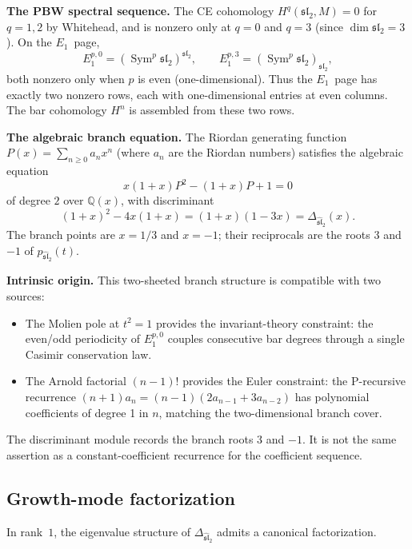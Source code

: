 \medskip\noindent
\textbf{The PBW spectral sequence.}
The CE cohomology \(H^q(\mathfrak{sl}_2,M)=0\) for
\(q=1,2\) by Whitehead, and is nonzero only at \(q=0\) and
\(q=3\) (since \(\dim\mathfrak{sl}_2=3\)).
On the \(E_1\)~page,
\[
E_1^{p,0}=(\operatorname{Sym}^p\mathfrak{sl}_2)^{\mathfrak{sl}_2},
\qquad
E_1^{p,3}=(\operatorname{Sym}^p\mathfrak{sl}_2)_{\mathfrak{sl}_2},
\]
both nonzero only when \(p\) is even (one-dimensional).
Thus the \(E_1\)~page has exactly two nonzero rows,
each with one-dimensional entries at even columns.
The bar cohomology \(H^n\) is assembled from these two rows.

\medskip\noindent
\textbf{The algebraic branch equation.}
The Riordan generating function
\(P(x)=\sum_{n\ge 0}a_n x^n\) (where \(a_n\) are the Riordan
numbers) satisfies the algebraic equation
\[
x(1{+}x)P^2-(1{+}x)P+1=0
\]
of degree \(2\) over \(\mathbb Q(x)\),
with discriminant
\[
(1{+}x)^2-4x(1{+}x)=(1{+}x)(1{-}3x)
=\Delta_{\widehat{\mathfrak{sl}}_2}(x).
\]
The branch points are \(x=1/3\) and \(x=-1\); their reciprocals are
the roots \(3\) and \(-1\) of \(p_{\widehat{\mathfrak{sl}}_2}(t)\).

\medskip\noindent
\textbf{Intrinsic origin.}
This two-sheeted branch structure is compatible with two sources:
\begin{itemize}
\item
The Molien pole at \(t^2=1\) provides the invariant-theory
constraint: the even/odd periodicity of
\(E_1^{p,0}\) couples consecutive bar degrees through a
single Casimir conservation law.
\item
The Arnold factorial \((n{-}1)!\) provides the Euler constraint:
the P-recursive recurrence
\((n{+}1)a_n=(n{-}1)(2a_{n{-}1}+3a_{n{-}2})\)
has polynomial coefficients of degree 1 in \(n\),
matching the two-dimensional branch cover.
\end{itemize}
The discriminant module records the branch roots \(3\) and \(-1\).
It is not the same assertion as a constant-coefficient recurrence for the
coefficient sequence.

\subsection{Growth-mode factorization}

In rank~\(1\), the eigenvalue structure of
\(\Delta_{\widehat{\mathfrak{sl}}_2}\) admits a canonical
factorization.

